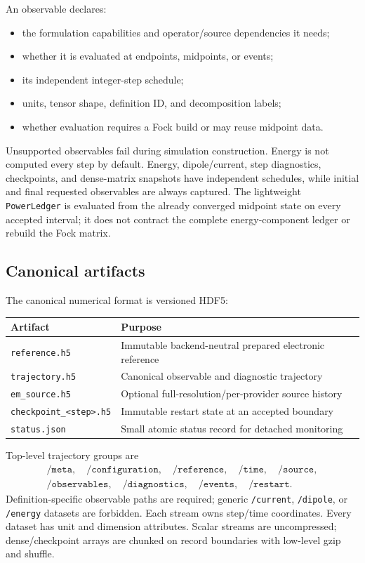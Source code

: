 \documentclass[11pt]{article}
\newcommand{\code}[1]{\texttt{#1}}
\begin{document}
An observable declares:

\begin{itemize}
\item the formulation capabilities and operator/source dependencies it needs;
\item whether it is evaluated at endpoints, midpoints, or events;
\item its independent integer-step schedule;
\item units, tensor shape, definition ID, and decomposition labels;
\item whether evaluation requires a Fock build or may reuse midpoint data.
\end{itemize}

Unsupported observables fail during simulation construction. Energy is not
computed every step by default. Energy, dipole/current, step diagnostics,
checkpoints, and dense-matrix snapshots have independent schedules, while
initial and final requested observables are always captured. The lightweight
\code{PowerLedger} is evaluated from the already converged midpoint state on
every accepted interval; it does not contract the complete energy-component
ledger or rebuild the Fock matrix.

\subsection{Canonical artifacts}

The canonical numerical format is versioned HDF5:

\begin{center}
\begin{tabularx}{\textwidth}{@{}lX@{}}
\toprule
Artifact & Purpose\\
\midrule
\code{reference.h5} & Immutable backend-neutral prepared electronic reference\\
\code{trajectory.h5} & Canonical observable and diagnostic trajectory\\
\code{em\_source.h5} & Optional full-resolution/per-provider source history\\
\code{checkpoint\_<step>.h5} & Immutable restart state at an accepted boundary\\
\code{status.json} & Small atomic status record for detached monitoring\\
\bottomrule
\end{tabularx}
\end{center}

Top-level trajectory groups are
\begin{gather*}
 \texttt{/meta},\quad
 \texttt{/configuration},\quad
 \texttt{/reference},\quad
 \texttt{/time},\quad
 \texttt{/source},\\
 \texttt{/observables},\quad
 \texttt{/diagnostics},\quad
 \texttt{/events},\quad
 \texttt{/restart}.
\end{gather*}
Definition-specific observable paths are required; generic
\texttt{/current}, \texttt{/dipole}, or \texttt{/energy} datasets are
forbidden. Each stream owns step/time coordinates. Every dataset has unit and
dimension attributes. Scalar streams are uncompressed; dense/checkpoint arrays
are chunked on record boundaries with low-level gzip and shuffle.
\end{document}
